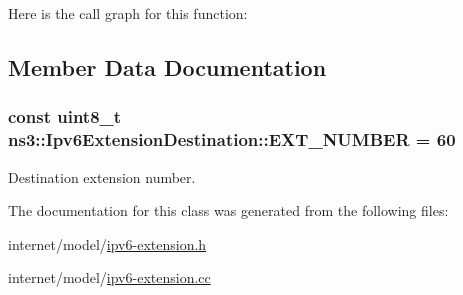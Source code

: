 Here is the call graph for this function\+:




\subsection{Member Data Documentation}
\subsubsection[{\texorpdfstring{E\+X\+T\+\_\+\+N\+U\+M\+B\+ER}{EXT_NUMBER}}]{\setlength{\rightskip}{0pt plus 5cm}const uint8\+\_\+t ns3\+::\+Ipv6\+Extension\+Destination\+::\+E\+X\+T\+\_\+\+N\+U\+M\+B\+ER = 60\hspace{0.3cm}{\ttfamily [static]}}\hypertarget{classns3_1_1Ipv6ExtensionDestination_a8d933839bc9f43f93b9e9b049edc929c}{}\label{classns3_1_1Ipv6ExtensionDestination_a8d933839bc9f43f93b9e9b049edc929c}


Destination extension number. 



The documentation for this class was generated from the following files\+:\begin{DoxyCompactItemize}
\item 
internet/model/\hyperlink{ipv6-extension_8h}{ipv6-\/extension.\+h}\item 
internet/model/\hyperlink{ipv6-extension_8cc}{ipv6-\/extension.\+cc}\end{DoxyCompactItemize}
